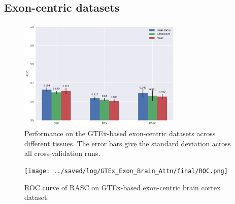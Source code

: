 \subsection{Exon-centric datasets} \label{subsec:gtex_exon}

\begin{figure}
	\centering\includegraphics[width=0.7\textwidth]{../visualizations/ch5-results/gtex_exon_barcharts.png} 
	\caption{Performance on the GTEx-based exon-centric datasets across different tissues. The error bars give the standard deviation across all cross-validation runs. }
	\label{fig:gtex_exon_barcharts}
\end{figure}

\begin{figure}
	\centering\texttt{[image: ../saved/log/GTEx\_Exon\_Brain\_Attn/final/ROC.png]} 
	\caption{
	ROC curve of RASC on GTEx-based exon-centric brain cortex dataset. 
  }
	\label{fig:gtex_exon_roc}
\end{figure}

